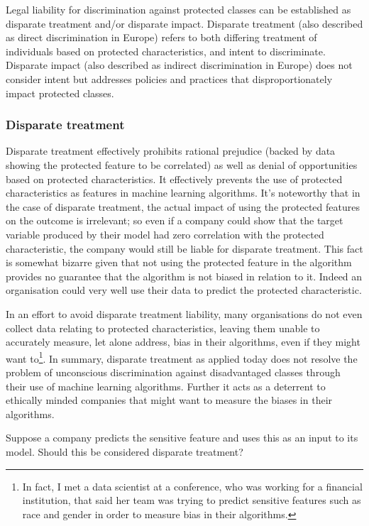 Legal liability for discrimination against protected classes can be established as disparate treatment and/or disparate impact. Disparate treatment (also described as direct discrimination in Europe) refers to both differing treatment of individuals based on protected characteristics, and intent to discriminate. Disparate impact (also described as indirect discrimination in Europe) does not consider intent but addresses policies and practices that disproportionately impact protected classes.

\subsubsection*{Disparate treatment}
%
Disparate treatment effectively prohibits rational prejudice (backed by data showing the protected feature to be correlated) as well as denial of opportunities based on protected characteristics. It effectively prevents the use of protected characteristics as features in machine learning algorithms. It's noteworthy that in the case of disparate treatment, the actual impact of using the protected features on the outcome is irrelevant; so even if a company could show that the target variable produced by their model had zero correlation with the protected characteristic, the company would still be liable for disparate treatment. This fact is somewhat bizarre given that not using the protected feature in the algorithm provides no guarantee that the algorithm is not biased in relation to it. Indeed an organisation could very well use their data to predict the protected characteristic.

In an effort to avoid disparate treatment liability, many organisations do not even collect data relating to protected characteristics, leaving them unable to accurately measure, let alone address, bias in their algorithms, even if they might want to\footnote{In fact, I met a data scientist at a conference, who was working for a financial institution, that said her team was trying to predict sensitive features such as race and gender in order to measure bias in their algorithms.}. In summary, disparate treatment as applied today does not resolve the problem of unconscious discrimination against disadvantaged classes through their use of machine learning algorithms. Further it acts as a deterrent to ethically minded companies that might want to measure the biases in their algorithms.

\begin{lookbox}
Suppose a company predicts the sensitive feature and uses this as an input to its model. Should this be considered disparate treatment?
\end{lookbox}

